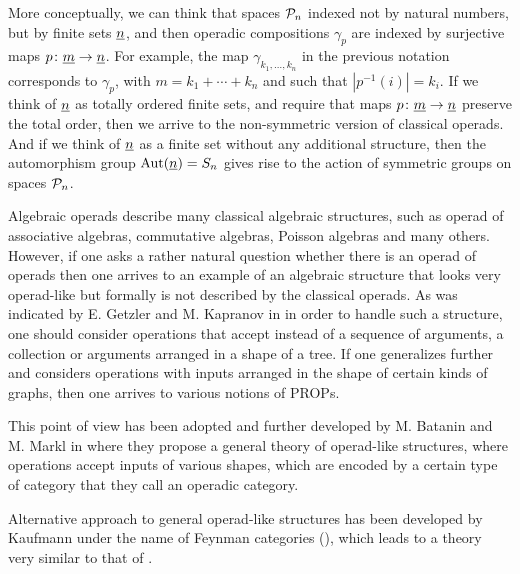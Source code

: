 \documentclass[letterpaper,12pt,leqno]{article}
\numberwithin{equation}{theorem}
\begin{document}
\begin{nparagraph}
More conceptually, we can think that spaces $\mathcal{P}_n$ indexed not by natural numbers, but by finite sets $\underline{n}$, and then operadic compositions $\gamma_p$ are indexed by surjective maps
$p\colon \underline{m} \to \underline{n}$. For example, the map $\gamma_{k_1, \ldots, k_n}$ in the previous notation corresponds to $\gamma_p$, with $m = k_1 + \cdots + k_n$ and such that $|p^{-1}(i)| = k_i$.
If we think of $\underline{n}$ as totally ordered finite sets, and require that maps $p \colon \underline{m} \to \underline{n}$ preserve the total order, then we arrive to the non-symmetric version of classical operads.
And if we think of $\underline{n}$ as a finite set without any additional structure, then the automorphism group $\mathrm{Aut}(\underline{n}) = S_n$ gives rise to the action of symmetric groups on spaces $\mathcal{P}_n$.

\end{nparagraph}

\begin{nparagraph}
Algebraic operads describe many classical algebraic structures, such as operad of associative algebras, commutative algebras, Poisson algebras and many others. However, if one asks a rather
natural question whether there is an operad of operads then one arrives to an example of an algebraic structure that looks very operad-like but formally is not described by the classical operads.
As was indicated by E. Getzler and M. Kapranov in \cite{Getz-Kap} in order to handle such a structure, one should consider operations that accept instead of a sequence of arguments, a collection
or arguments arranged in a shape of a tree. If one generalizes further and considers operations with inputs arranged in the shape of certain kinds of graphs, then one arrives to various notions
of PROPs.

This point of view has been adopted and further developed by M. Batanin and M. Markl in \cite{Bat-Markl} where they propose a general theory of operad-like structures, where operations accept
inputs of various shapes, which are encoded by a certain type of category that they call an operadic category.

Alternative approach to general operad-like structures has been developed by Kaufmann under the name of Feynman categories (\cite{Kaufmann}), which leads to a theory very similar to that of
\cite{Bat-Markl}.

\end{nparagraph}
\end{document}
